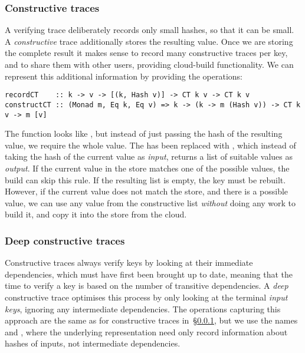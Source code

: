 \subsubsection{Constructive traces}\label{sec-constructive-traces}

A verifying trace deliberately records only small hashes, so that it can be small.
A \emph{constructive} trace additionally stores the resulting value.
Once we are storing the complete result it makes sense
to record many constructive traces per key, and to share them with other users,
providing cloud-build functionality. We can represent this additional
information by providing the operations:

\begin{verbatim}
recordCT    :: k -> v -> [(k, Hash v)] -> CT k v -> CT k v
constructCT :: (Monad m, Eq k, Eq v) => k -> (k -> m (Hash v)) -> CT k v -> m [v]
\end{verbatim}

\noindent
The function  looks like , but instead of just passing
the hash of the resulting value, we require the whole value. The 
has been replaced with , which instead of taking the hash of the
current value as \emph{input}, returns a list of suitable values as \emph{output}.
If the current value in the store
matches one of the possible values, the build can skip this rule. If the
resulting list is empty, the key must be rebuilt. However, if the current value
does not match the store, and there is a possible value, we can use any value
from the constructive list \emph{without} doing any work to build it, and copy
it into the store from the cloud.

\subsubsection{Deep constructive traces}\label{sec-deep-constructive-traces}

Constructive traces always verify keys by looking at their immediate
dependencies, which must have first been brought up to date, meaning that the
time to verify a key is based on the number of transitive dependencies. A
\emph{deep} constructive trace optimises this process by only looking at the
terminal \emph{input keys}, ignoring any intermediate dependencies. The operations
capturing this approach are the same as for constructive traces
in~\S\ref{sec-constructive-traces}, but we use the names  and
, where the underlying  representation need only record
information about hashes of inputs, not intermediate dependencies.

